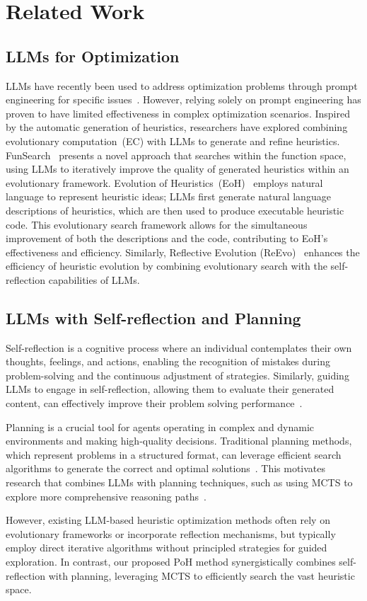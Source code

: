 \section{Related Work}
\subsection{LLMs for Optimization}

LLMs have recently been used to address optimization problems through prompt engineering for specific issues~\cite{yang2024large,wei2022chain}. However, relying solely on prompt engineering has proven to have limited effectiveness in complex optimization scenarios. Inspired by the automatic generation of heuristics, researchers have explored combining evolutionary computation~(EC) with LLMs to generate and refine heuristics. FunSearch~\cite{article} presents a novel approach that searches within the function space, using LLMs to iteratively improve the quality of generated heuristics within an evolutionary framework. Evolution of Heuristics~(EoH)~\cite{Liu2024EvolutionOH} employs natural language to represent heuristic ideas; LLMs first generate natural language descriptions of heuristics, which are then used to produce executable heuristic code. This evolutionary search framework allows for the simultaneous improvement of both the descriptions and the code, contributing to EoH's effectiveness and efficiency. Similarly, Reflective Evolution (ReEvo)~\cite{ye2024reevo} enhances the efficiency of heuristic evolution by combining evolutionary search with the self-reflection capabilities of LLMs.
\subsection{LLMs with Self-reflection and Planning}

Self-reflection is a cognitive process where an individual contemplates their own thoughts, feelings, and actions, enabling the recognition of mistakes during problem-solving and the continuous adjustment of strategies. Similarly, guiding LLMs to engage in self-reflection, allowing them to evaluate their generated content, can effectively improve their problem solving performance~\cite{shinn2023reflexionlanguageagentsverbal,10.1145/3657604.3662042,huang2022innermonologueembodiedreasoning}.

Planning is a crucial tool for agents operating in complex and dynamic environments and making high-quality decisions. Traditional planning methods, which represent problems in a structured format, can leverage efficient search algorithms to generate the correct and optimal solutions~\cite{cheng-etal-2022-improving,vath-etal-2023-conversational,Liu2023LLMPEL}. This motivates research that combines LLMs with planning techniques, such as using MCTS to explore more comprehensive reasoning paths~\cite{wang2024promptagent,hao2023reasoning}.

However, existing LLM-based heuristic optimization methods often rely on evolutionary frameworks or incorporate reflection mechanisms, but typically employ direct iterative algorithms without principled strategies for guided exploration.  In contrast, our proposed PoH method synergistically combines self-reflection with planning, leveraging MCTS to efficiently search the vast heuristic space.
